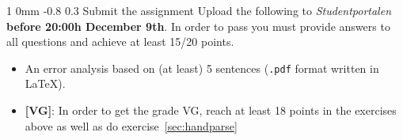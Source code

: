 \documentclass[11pt]{article}
\makeatletter
\newcommand{\newsec}[2]{\section{#1}\label{sec:#2}\noindent}
\renewcommand{\section}{\@startsection
{section}%
{1}%
{0mm}%
{-0.8\baselineskip}%
{0.3\baselineskip}%
{\bfseries\large}}%
\makeatother
\begin{document}
\newsec{Submit the assignment}{sub}%
Upload the following to {\it Studentportalen} \textbf{before 20:00h
  December 9th}. In order to pass you must provide answers to all
questions and achieve at least 15/20 points.
\begin{itemize}[noitemsep,topsep=0.2cm]
\item An error analysis based on (at least) 5 sentences (\texttt{.pdf}
  format written in \LaTeX).
\item \textbf{[VG]}: In order to get the grade VG, reach at least 18
    points in the exercises above as well as do exercise~\ref{sec:handparse}
\end{itemize}
\end{document}
